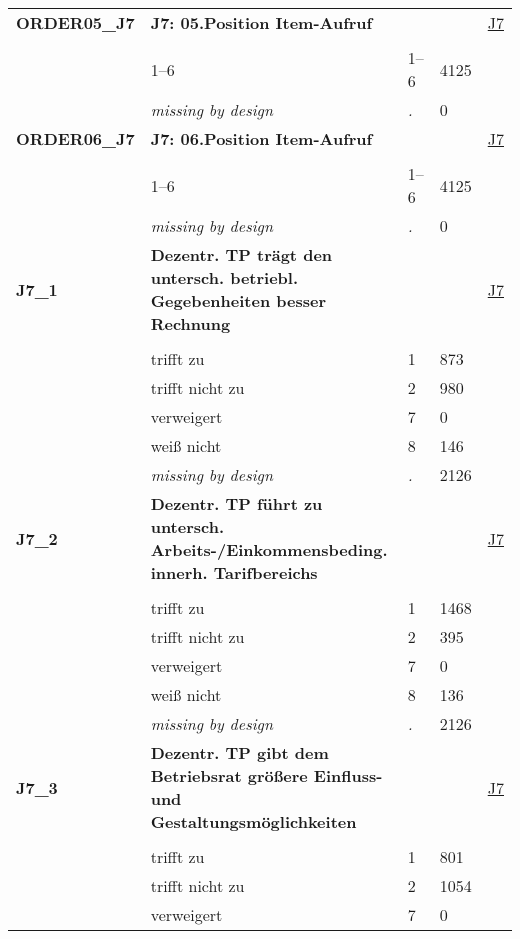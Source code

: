 \begin{longtable}{| L{2.65cm} | L{8cm} | C{1.5cm} | R{1.25cm} | C{2.25cm}  |}
   \midrule
\textbf{ORDER05\_J7}\label{var:ORDER05:J7} & \textbf{J7: 05.Position Item-Aufruf} &  &  & \hyperref[J7]{J7} \\ 
   &  &  &  &  \\ 
   & 1--6 & 1--6 & 4125 &  \\ 
   & \textit{missing by design} & \textit{.} & 0 &  \\ 
   \midrule
\textbf{ORDER06\_J7}\label{var:ORDER06:J7} & \textbf{J7: 06.Position Item-Aufruf} &  &  & \hyperref[J7]{J7} \\ 
   &  &  &  &  \\ 
   & 1--6 & 1--6 & 4125 &  \\ 
   & \textit{missing by design} & \textit{.} & 0 &  \\ 
   \midrule
\textbf{J7\_1}\label{var:J7:1} & \textbf{Dezentr. TP trägt den untersch. betriebl. Gegebenheiten besser Rechnung} &  &  & \hyperref[J7]{J7} \\ 
   &  &  &  &  \\ 
   & trifft zu & 1 & 873 &  \\ 
   & trifft nicht zu & 2 & 980 &  \\ 
   & verweigert & 7 & 0 &  \\ 
   & weiß nicht & 8 & 146 &  \\ 
   & \textit{missing by design} & \textit{.} & 2126 &  \\ 
   \midrule
\textbf{J7\_2}\label{var:J7:2} & \textbf{Dezentr. TP führt zu untersch. Arbeits-/Einkommensbeding. innerh. Tarifbereichs} &  &  & \hyperref[J7]{J7} \\ 
   &  &  &  &  \\ 
   & trifft zu & 1 & 1468 &  \\ 
   & trifft nicht zu & 2 & 395 &  \\ 
   & verweigert & 7 & 0 &  \\ 
   & weiß nicht & 8 & 136 &  \\ 
   & \textit{missing by design} & \textit{.} & 2126 &  \\ 
   \midrule
\textbf{J7\_3}\label{var:J7:3} & \textbf{Dezentr. TP gibt dem Betriebsrat größere Einfluss- und Gestaltungsmöglichkeiten} &  &  & \hyperref[J7]{J7} \\ 
   &  &  &  &  \\ 
   & trifft zu & 1 & 801 &  \\ 
   & trifft nicht zu & 2 & 1054 &  \\ 
   & verweigert & 7 & 0 &  \\ 

\end{longtable}
